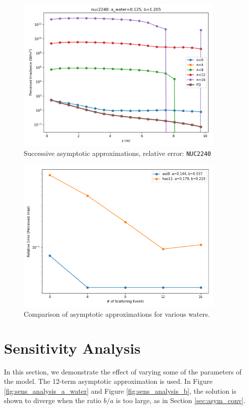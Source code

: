 \documentclass[ms,cpyr,lof,lot]{uathesis}
\begin{document}
\begin{figure}[H]
  \centering
  \includegraphics[width=4in]{asym_conv_irrad_nuc2240}
  \caption{Successive asymptotic approximations, relative error: \texttt{NUC2240}}
\end{figure}


\begin{figure}[H]
  \centering
  \includegraphics[width=4in]{asym_conv_compare}
  \caption{Comparison of asymptotic approximations for various waters.}
  \label{fig:asym_conv_compare}
\end{figure}

\section{Sensitivity Analysis}
In this section, we demonstrate the effect of varying some of the parameters of the model.
The 12-term asymptotic approximation is used.
In Figure \ref{fig:sens_analysis_a_water} and Figure \ref{fig:sens_analysis_b}, the solution
is shown to diverge when the ratio $b/a$ is too large, as in Section \ref{sec:asym_conv}.
\end{document}
